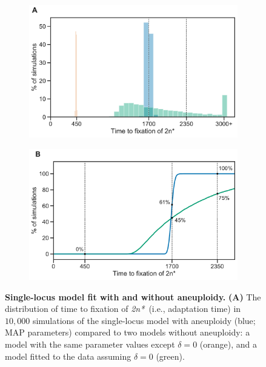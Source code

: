 \documentclass[12pt]{extarticle}
\newcommand{\eumt}{\emph{2n*}}
\begin{document}
\begin{figure}[p]
  \begin{subfigure}{0.5\textwidth}
      \centering
      \includegraphics[width=\textwidth]{../figures/fixation-plot-a.pdf}      
      \label{fig:fit}
  \end{subfigure}
  \begin{subfigure}{0.5\textwidth}
      \centering
      \includegraphics[width=\textwidth]{../figures/fixation-plot-b.pdf}      
      \label{fig:fit-cumulative}
  \end{subfigure}
  \caption{
    \textbf{Single-locus model fit with and without aneuploidy.}
    \textbf{(A)} The distribution of time to fixation of \eumt\ (i.e., adaptation time) in $10,000$ simulations of the single-locus model with aneuploidy (blue; MAP parameters) compared to two models without aneuploidy: a model with the same parameter values except $\delta=0$ (orange), and a model fitted to the data assuming $\delta=0$ (green).
}
\end{figure}
\end{document}
